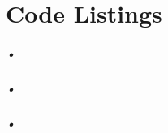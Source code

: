 \documentclass[a4paper, 12pt, openright, twoside]{report}
\begin{document}
\appendix
\chapter{Code Listings}
\label{cha:app-code}

\paragraph{•}
\begin{minipage}{\linewidth}

\end{minipage}

\paragraph{•}
\begin{minipage}{\linewidth}

\end{minipage}

\paragraph{•}
\begin{minipage}{\linewidth}

\end{minipage}

{}

\end{document}
